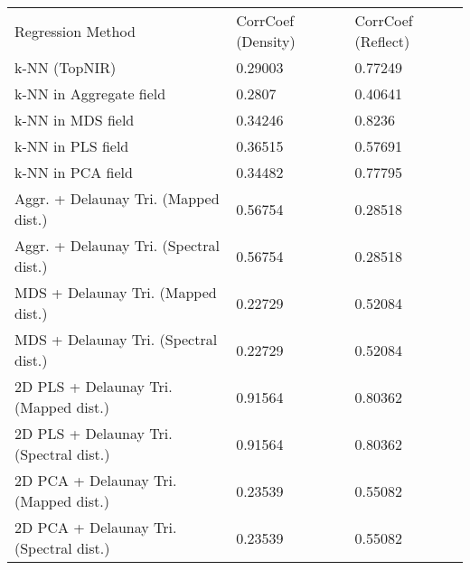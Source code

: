 \begin{table}[!hb]
	\centering
	\begin{tabular}{lll}
		Regression Method			& CorrCoef (Density)	& CorrCoef (Reflect)\\
		k-NN (TopNIR)				& 0.29003		& 0.77249\\
		k-NN in Aggregate field			& 0.2807		& 0.40641\\
		k-NN in MDS field			& 0.34246		& 0.8236\\
		k-NN in PLS field			& 0.36515		& 0.57691\\
		k-NN in PCA field			& 0.34482		& 0.77795\\
		Aggr. + Delaunay Tri. (Mapped dist.)	& 0.56754		& 0.28518\\
		Aggr. + Delaunay Tri. (Spectral dist.)	& 0.56754		& 0.28518\\
		MDS + Delaunay Tri. (Mapped dist.)	& 0.22729		& 0.52084\\
		MDS + Delaunay Tri. (Spectral dist.)	& 0.22729		& 0.52084\\
		2D PLS + Delaunay Tri. (Mapped dist.)	& 0.91564		& 0.80362\\
		2D PLS + Delaunay Tri. (Spectral dist.)	& 0.91564		& 0.80362\\
		2D PCA + Delaunay Tri. (Mapped dist.)	& 0.23539		& 0.55082\\
		2D PCA + Delaunay Tri. (Spectral dist.)	& 0.23539		& 0.55082\\
	\end{tabular}
\end{table}
